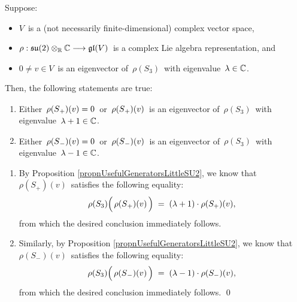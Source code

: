 \clearpage
\vskip 0.5cm
\begin{corollary}
\label{RaisingLoweringEigenvalues}
\mbox{}
\vskip 0.1cm
\noindent
Suppose:
\begin{itemize}
\item
	$V$\, is a (not necessarily finite-dimensional) complex vector space,
\item
	$\rho : \mathfrak{su}(2) \otimes_{\mathbb{R}} \mathbb{C} \longrightarrow \mathfrak{gl}(V)$\,
	is a complex Lie algebra representation, and
\item	
	$0 \neq v \in V$\, is an eigenvector of \,$\rho(S_{3})$\, with eigenvalue \,$\lambda \in \mathbb{C}$.\,
\end{itemize}
Then, the following statements are true:
\begin{enumerate}
\item
	Either
	\,$\rho(\overset{{\color{white}.}}{S}_{+})(v) = 0$\,
	or 
	\,$\rho(\overset{{\color{white}.}}{S}_{+})(v)$\,
	is an eigenvector of
	\,$\rho(S_{3})$\,
	with eigenvalue
	\,$\lambda + 1 \in \mathbb{C}$.\,
\item
	Either
	\,$\rho(\overset{{\color{white}.}}{S}_{-})(v) = 0$\,
	or 
	\,$\rho(\overset{{\color{white}.}}{S}_{-})(v)$\,
	is an eigenvector of
	\,$\rho(S_{3})$\,
	with eigenvalue
	\,$\lambda - 1 \in \mathbb{C}$.\,
\end{enumerate}
\end{corollary}
\proof 
\begin{enumerate}
\item
	By Proposition \ref{propnUsefulGeneratorsLittleSU2},
	we know that \,$\rho(S_{+})(v)$\, satisfies the following equality:
	\begin{equation*}
	\rho(S_{3})\!\left(\,\rho(\overset{{\color{white}.}}{S}_{+})(v)\,\right)
	\; = \;
		(\lambda+1) \cdot \rho(S_{+})(v),\,
	\end{equation*}
	from which the desired conclusion immediately follows.
\item
	Similarly, by Proposition \ref{propnUsefulGeneratorsLittleSU2},
	we know that \,$\rho(S_{-})(v)$\, satisfies the following equality:
	\begin{equation*}
	\rho(S_{3})\!\left(\,\rho(\overset{{\color{white}.}}{S}_{-})(v)\,\right)
	\; = \;
		(\lambda-1) \cdot \rho(S_{-})(v),\,
	\end{equation*}
	from which the desired conclusion immediately follows.
	\qed
\end{enumerate}


